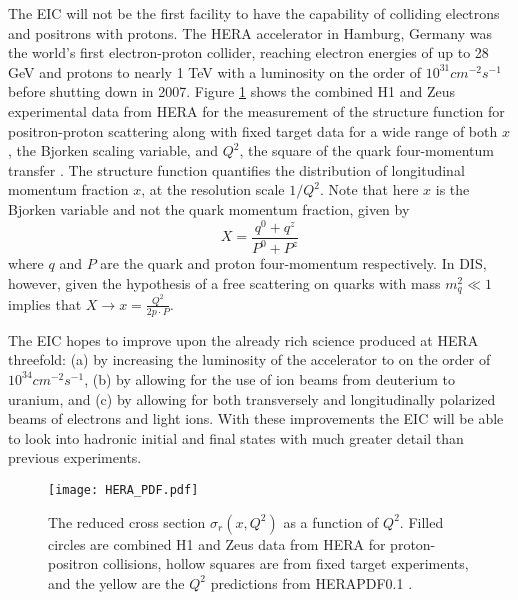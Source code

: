 The EIC will not be the first facility to have the capability of colliding electrons and positrons with protons. The HERA accelerator in Hamburg, Germany was the world's first electron-proton collider, reaching electron energies of up to 28 GeV and protons to nearly 1 TeV with a luminosity on the order of $10^{31}\unit{cm}^{-2}\unit{s}^{-1}$ before shutting down in 2007. Figure \ref{fig:HERA_pdf} shows the combined H1 and Zeus experimental data from HERA for the measurement of the structure function for positron-proton scattering along with fixed target data for a wide range of both $x$, the Bjorken scaling variable, and $Q^2$, the square of the quark four-momentum transfer \cite{HERAStructureFunction}. The structure function quantifies the distribution of longitudinal momentum fraction $x$, at the resolution scale $1/Q^2$. Note that here $x$ is the Bjorken variable and not the quark momentum fraction, given by
%
\begin{equation}
X = \frac{q^0 + q^z}{P^0 + P^z}
\label{eq:momFrac}
\end{equation}
%
where $q$ and $P$ are the quark and proton four-momentum respectively. In DIS, however, given the hypothesis of a free scattering on quarks with mass $m_q^2 \ll 1$ implies that $X \rightarrow x = \frac{Q^2}{2p\cdot P}$.

The EIC hopes to improve upon the already rich science produced at HERA threefold: (a) by increasing the luminosity of the accelerator to on the order of $10^{34}\unit{cm}^{-2}\unit{s}^{-1}$, (b) by allowing for the use of ion beams from deuterium to uranium, and (c) by allowing for both transversely and longitudinally polarized beams of electrons and light ions. With these improvements the EIC will be able to look into hadronic initial and final states with much greater detail than previous experiments.

\begin{figure}[!htb]
	\centering
	\texttt{[image: HERA\_PDF.pdf]}
	\caption[The reduced cross section $\sigma_{r}(x,Q^2)$ as a function of $Q^2$.]{The reduced cross section $\sigma_{r}(x,Q^2)$ as a function of $Q^2$. Filled circles are combined H1 and Zeus data from HERA for proton-positron collisions, hollow squares are from fixed target experiments, and the yellow are the $Q^2$ predictions from HERAPDF0.1 \cite{HERAStructureFunction}.}
	\label{fig:HERA_pdf}
\end{figure}

